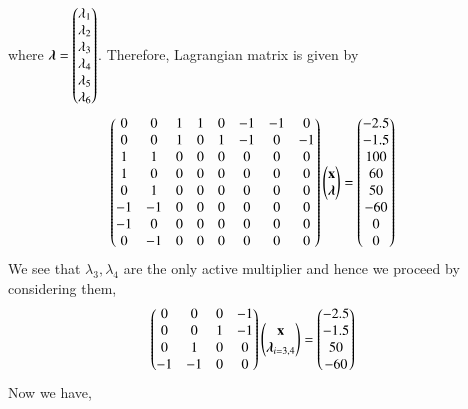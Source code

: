 \documentclass[journal,12pt,twocolumn]{IEEEtran}
\begin{document}
where $\boldsymbol{\lambda}=\begin{pmatrix}\lambda_1 \\ \lambda_2 \\ \lambda_3 \\ \lambda_4 \\ \lambda_5 \\ \lambda_6\end{pmatrix} $. Therefore, Lagrangian matrix is given by
\begin{align}
    \begin{pmatrix}0 & 0 & 1 & 1 & 0 & -1 & -1 & 0 \\ 0 & 0 & 1 & 0 & 1 & -1 & 0 & -1 \\ 1 & 1 & 0 & 0 & 0 & 0 & 0 & 0 \\ 1 & 0 & 0 & 0 & 0 & 0 & 0 & 0 \\ 0 & 1 & 0 & 0 & 0 & 0 & 0 & 0 \\ -1 & -1 & 0 & 0 & 0 & 0 & 0 & 0 \\ -1 & 0 & 0 & 0 & 0 & 0 & 0 & 0 \\ 0 & -1 & 0 & 0 & 0 & 0 & 0 & 0 \end{pmatrix}\begin{pmatrix}\mathbf{x} \\ \boldsymbol{\lambda}\end{pmatrix} &= \begin{pmatrix}-2.5 \\ -1.5 \\ 100 \\ 60 \\ 50 \\ -60 \\0 \\ 0 \end{pmatrix}
\end{align}
We see that $\lambda_3,\lambda_4$ are the only active multiplier and hence we proceed by considering them,
\begin{align}
    \begin{pmatrix}0 & 0 & 0 & -1 \\ 0 & 0 & 1 & -1 \\ 0 & 1 & 0 & 0 \\ -1 & -1 & 0 & 0\end{pmatrix}\begin{pmatrix}\mathbf{x}\\ \boldsymbol{\lambda}_{i=3,4}\end{pmatrix} &= \begin{pmatrix}-2.5 \\ -1.5 \\ 50 \\ -60\end{pmatrix}
\end{align}
Now we have,
\end{document}
